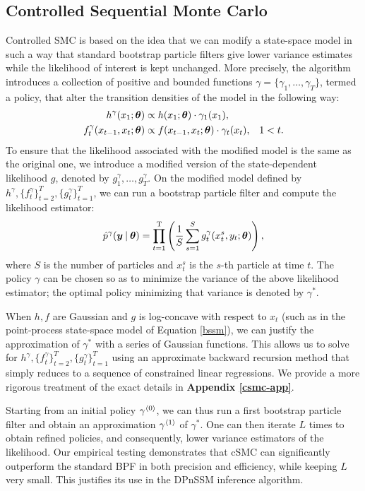 \documentclass[twoside]{article}
\begin{document}
\subsection{Controlled Sequential Monte Carlo} \label{ssec:csmc}
Controlled SMC is based on the idea that we can modify a state-space model in such a way that standard bootstrap particle filters \citep{doucet2001introduction} give lower variance estimates while the likelihood of interest is kept unchanged. More precisely, the algorithm introduces a collection of positive and bounded functions $\gamma = \{\gamma_1, \ldots, \gamma_T\}$, termed a policy, that alter the transition densities of the model in the following way:
\begin{align}
h^\gamma(x_1; \boldsymbol{\theta}) &\propto h(x_1; \boldsymbol{\theta}) \cdot \gamma_1(x_1), \\
f^\gamma_t(x_{t-1}, x_{t}; \boldsymbol{\theta}) &\propto f(x_{t-1}, x_t; \boldsymbol{\theta}) \cdot \gamma_t(x_t), & 1 < t. \nonumber
\end{align}
To ensure that the likelihood associated with the modified model is the same as the original one, we introduce a modified version of the state-dependent likelihood $g$, denoted by $g_{1}^{\gamma},\ldots,g_{T}^{\gamma}$. On the modified model defined by $h^{\gamma}, \{f_{t}^{\gamma}\}_{t=2}^T,\{g_{t}^{\gamma}\}_{t=1}^T$, we can run a bootstrap particle filter and compute the likelihood estimator:
\begin{align}
\hat{p}^{\gamma}(\boldsymbol{y} \:\vert\: \boldsymbol{\theta}) = \prod_{t=1}^\text{T} \left(\frac{1}{S} \sum_{s=1}^S g_t^\gamma(x_t^s, y_t; \boldsymbol{\theta})\right),
\end{align}
where $S$ is the number of particles and $x_t^s$ is the $s$-th particle at time $t$.  The policy $\gamma$ can be chosen so as to minimize the variance of the above likelihood estimator; the optimal policy minimizing that variance is denoted by $\gamma^{*}$.

When $h, f$ are Gaussian and $g$ is log-concave with respect to $x_t$ (such as in the point-process state-space model of Equation \ref{bssm}), we can justify the approximation of $\gamma^*$ with a series of Gaussian functions. This allows us to solve for $h^{\gamma}, \{f_{t}^{\gamma}\}_{t=2}^T,\{g_{t}^{\gamma}\}_{t=1}^T$ using an approximate backward recursion method that simply reduces to a sequence of constrained linear regressions. We provide a more rigorous treatment of the exact details in \textbf{Appendix \ref{csmc-app}}.  

Starting from an initial policy {$\gamma^{\langle0\rangle}_{}$}, we can thus run a first bootstrap particle filter and obtain an approximation {$\gamma^{\langle1\rangle}_{}$} of $\gamma^{*}$. One can then iterate $L$ times to obtain refined policies, and consequently, lower variance estimators of the likelihood. Our empirical testing demonstrates that cSMC can significantly outperform the standard BPF in both precision and efficiency, while keeping $L$ very small. This justifies its use in the DPnSSM inference algorithm.
\end{document}
